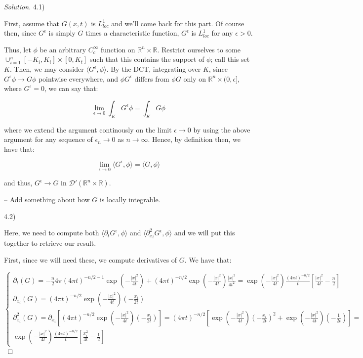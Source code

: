 \documentclass[10pt]{article}
\begin{document}
\begin{proof}[Solution]

4.1)

First, assume that $G(x,t)$ is $L^1_{loc}$ and we'll come back for this part. Of course then, since $G^\epsilon$ is simply $G$ times a characteristic function, $G^\epsilon$ is $L^1_{loc}$ for any $\epsilon > 0$.

Thus, let $\phi$ be an arbitrary $C^\infty_c$ function on $\mathbb{R}^n \times \mathbb{R}$. Restrict ourselves to some $\cup_{i=1}^n [-K_i, K_i] \times [0, K_t]$ such that this contains the support of $\phi$; call this set $K$. Then, we may consider $\langle G^\epsilon, \phi \rangle$. By the DCT, integrating over $K$, since $G^\epsilon \phi \to G \phi$ pointwise everywhere, and $\phi G^\epsilon$ differs from $\phi G$ only on $\mathbb{R}^n \times (0, \epsilon]$, where $G^\epsilon = 0$, we can say that:

$$ \lim_{\epsilon \to 0} \int_K G^\epsilon \phi = \int_K G \phi $$

where we extend the argument continously on the limit $\epsilon \to 0$ by using the above argument for any sequence of $\epsilon_n \to 0$ as $n \to \infty$. Hence, by definition then, we have that:

$$ \lim_{\epsilon \to 0} \langle G^\epsilon, \phi \rangle = \langle G, \phi \rangle $$

and thus, $G^\epsilon \to G$ in $\mathcal{D}'(\mathbb{R}^n \times \mathbb{R})$.

-- Add something about how $G$ is locally integrable.

4.2)

Here, we need to compute both $\langle \partial_t G^\epsilon, \phi \rangle$ and $\langle \partial_{x_i}^2 G^\epsilon, \phi \rangle$ and we will put this together to retrieve our result.

First, since we will need these, we compute derivatives of $G$. We have that:

$$ \begin{cases} \partial_t(G) = -\frac{n}{2} 4\pi (4 \pi t)^{-n/2 - 1} \exp\left(-\frac{| x|^2}{4t}\right) + (4\pi t)^{-n/2}\exp\left(-\frac{| x|^2}{4t}\right) \frac{|x|^2}{4t^2} = \exp\left(-\frac{| x|^2}{4t}\right) \frac{(4\pi t)^{-n/2}}{t} \left[ \frac{|x|^2}{4t} - \frac{n}{2} \right] \\ \partial_{x_i}(G) = (4\pi t)^{-n/2}\exp\left(-\frac{| x|^2}{4t}\right)\left( -\frac{x_i}{2t}\right) \\ \partial_{x_i}^2(G) = \partial_{x_i}\left[(4\pi t)^{-n/2}\exp\left(-\frac{| x|^2}{4t}\right)\left( -\frac{x_i}{2t}\right) \right] = (4\pi t)^{-n/2} \left[  \exp\left(-\frac{| x|^2}{4t}\right)\left( -\frac{x_i}{2t}\right)^2 +\exp\left(-\frac{| x|^2}{4t}\right)\left( -\frac{1}{2t}\right) \right] = 
\\ \exp\left(-\frac{| x|^2}{4t}\right) \frac{(4\pi t)^{-n/2}}{t}  \left[ \frac{x_i^2}{4t} - \frac{1}{2} \right] \end{cases}$$


\end{proof}
\end{document}
